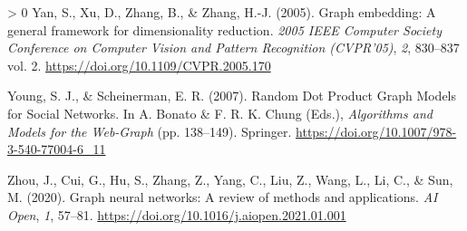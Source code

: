\documentclass[10pt,oneside]{article}
\newlength{\cslhangindent}
\newenvironment{CSLReferences}[3] %
 {%
  \setlength{\parindent}{0pt}
  \ifodd #1 \everypar{\setlength{\hangindent}{\cslhangindent}}\ignorespaces\fi
  \ifnum #2 > 0
  \setlength{\parskip}{#2\baselineskip}
  \fi
 }%
 {}
\begin{document}
\begin{CSLReferences}{1}{0}
\leavevmode\hypertarget{ref-Yan2005GraEmb}{}%
Yan, S., Xu, D., Zhang, B., \& Zhang, H.-J. (2005). Graph embedding: A
general framework for dimensionality reduction. \emph{2005 IEEE Computer
Society Conference on Computer Vision and Pattern Recognition
(CVPR'05)}, \emph{2}, 830--837 vol. 2.
\url{https://doi.org/10.1109/CVPR.2005.170}

\leavevmode\hypertarget{ref-Young2007RanDot}{}%
Young, S. J., \& Scheinerman, E. R. (2007). Random Dot Product Graph
Models for Social Networks. In A. Bonato \& F. R. K. Chung (Eds.),
\emph{Algorithms and Models for the Web-Graph} (pp. 138--149). Springer.
\url{https://doi.org/10.1007/978-3-540-77004-6_11}

\leavevmode\hypertarget{ref-Zhou2020GraNeu}{}%
Zhou, J., Cui, G., Hu, S., Zhang, Z., Yang, C., Liu, Z., Wang, L., Li,
C., \& Sun, M. (2020). Graph neural networks: A review of methods and
applications. \emph{AI Open}, \emph{1}, 57--81.
\url{https://doi.org/10.1016/j.aiopen.2021.01.001}

\end{CSLReferences}
\end{document}
